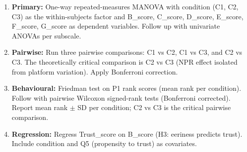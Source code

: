 \documentclass[11pt, a4paper]{article}
\begin{document}
\begin{enumerate}[itemsep=4pt]
  \item \textbf{Primary:} One-way repeated-measures MANOVA with condition (C1, C2, C3) as the within-subjects factor and B\_score, C\_score, D\_score, E\_score, F\_score, G\_score as dependent variables. Follow up with univariate ANOVAs per subscale.
  \item \textbf{Pairwise:} Run three pairwise comparisons: C1 vs C2, C1 vs C3, and C2 vs C3. The theoretically critical comparison is C2 vs C3 (NPR effect isolated from platform variation). Apply Bonferroni correction.
  \item \textbf{Behavioural:} Friedman test on P1 rank scores (mean rank per condition). Follow with pairwise Wilcoxon signed-rank tests (Bonferroni corrected). Report mean rank $\pm$ SD per condition; C2 vs C3 is the critical pairwise comparison.
  \item \textbf{Regression:} Regress Trust\_score on B\_score (H3: eeriness predicts trust). Include condition and Q5 (propensity to trust) as covariates.
\end{enumerate}
\end{document}
